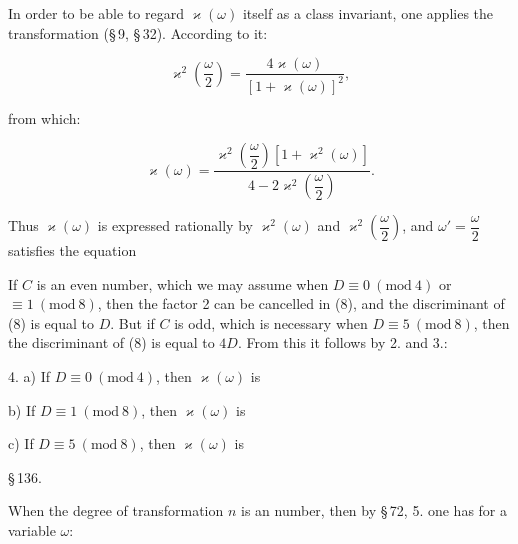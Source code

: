 
In order to be able to regard $\varkappa(\omega)$ itself as a class invariant, one
applies the  transformation (\S\,9, \S\,32). According to
it:

\[ \varkappa^2\left(\dfrac{\omega}{2}\right) = \dfrac{4\varkappa(\omega)}{[1+\varkappa(\omega)]^2}, \]

from which:

\[ \varkappa(\omega) = \dfrac{\varkappa^2\left(\dfrac{\omega}{2}\right)[1+\varkappa^2(\omega)]}{4-2\varkappa^2\left(\dfrac{\omega}{2}\right)}. \]

Thus $\varkappa(\omega)$ is expressed rationally by $\varkappa^2(\omega)$ and
$\varkappa^2\left(\dfrac{\omega}{2}\right)$, and $\omega' = \dfrac{\omega}{2}$ satisfies the equation


If $C$ is an even number, which we may assume when
$D\equiv 0\ (\mathrm{mod}\ 4)$ or $\equiv 1\ (\mathrm{mod}\ 8)$, then the
factor 2 can be cancelled in (8), and the discriminant of (8) is
equal to $D$. But if $C$ is odd, which is necessary when $D\equiv 5\ (\mathrm{mod}\ 8)$, then the discriminant of (8) is equal to $4D$. From this
it follows by 2. and 3.:

4. a) If $D\equiv 0\ (\mathrm{mod}\ 4)$, then $\varkappa(\omega)$ is 

b) If $D\equiv 1\ (\mathrm{mod}\ 8)$, then $\varkappa(\omega)$ is 

c) If $D\equiv 5\ (\mathrm{mod}\ 8)$, then $\varkappa(\omega)$ is 

\begin{center}
\S\,136.\quad {}
\end{center}

When the degree of transformation $n$ is an 
number, then by \S\,72, 5. one has for a variable $\omega$:

